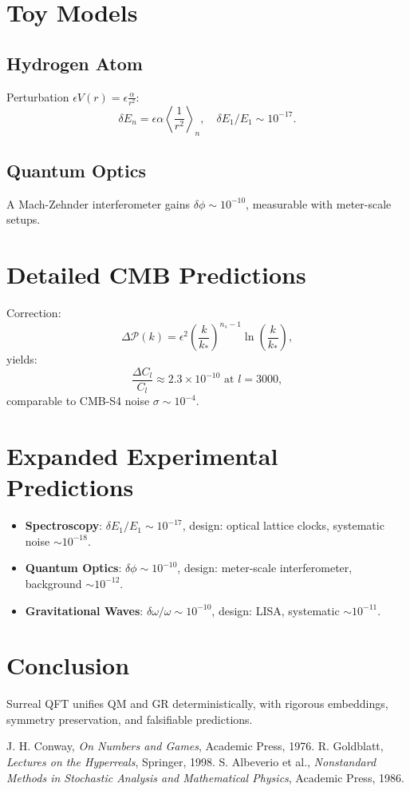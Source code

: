 \documentclass{article}
\begin{document}
\section{Toy Models}
\subsection{Hydrogen Atom}
Perturbation \(\epsilon V(r) = \epsilon \frac{\alpha}{r^2}\):
\begin{equation}
\delta E_n = \epsilon \alpha \left\langle \frac{1}{r^2} \right\rangle_n, \quad \delta E_1 / E_1 \sim 10^{-17}.
\end{equation}

\subsection{Quantum Optics}
A Mach-Zehnder interferometer gains \(\delta \phi \sim 10^{-10}\), measurable with meter-scale setups.

\section{Detailed CMB Predictions}
Correction:
\begin{equation}
\Delta \mathcal{P}(k) = \epsilon^2 \left( \frac{k}{k_*} \right)^{n_s-1} \ln \left( \frac{k}{k_*} \right),
\end{equation}
yields:
\begin{equation}
\frac{\Delta C_l}{C_l} \approx 2.3 \times 10^{-10} \text{ at } l = 3000,
\end{equation}
comparable to CMB-S4 noise \(\sigma \sim 10^{-4}\).

\section{Expanded Experimental Predictions}
\begin{itemize}
    \item \textbf{Spectroscopy}: \(\delta E_1 / E_1 \sim 10^{-17}\), design: optical lattice clocks, systematic noise \(\sim 10^{-18}\).
    \item \textbf{Quantum Optics}: \(\delta \phi \sim 10^{-10}\), design: meter-scale interferometer, background \(\sim 10^{-12}\).
    \item \textbf{Gravitational Waves}: \(\delta \omega / \omega \sim 10^{-10}\), design: LISA, systematic \(\sim 10^{-11}\).
\end{itemize}

\section{Conclusion}
Surreal QFT unifies QM and GR deterministically, with rigorous embeddings, symmetry preservation, and falsifiable predictions.

\begin{thebibliography}{9}
 J. H. Conway, \emph{On Numbers and Games}, Academic Press, 1976.
 R. Goldblatt, \emph{Lectures on the Hyperreals}, Springer, 1998.
 S. Albeverio et al., \emph{Nonstandard Methods in Stochastic Analysis and Mathematical Physics}, Academic Press, 1986.
\end{thebibliography}
\end{document}
